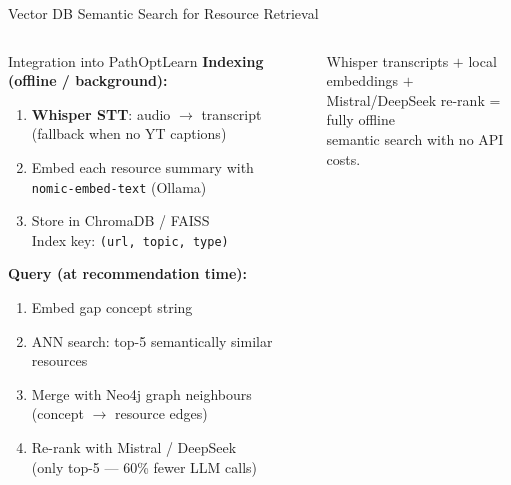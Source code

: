 \documentclass[aspectratio=169,9pt]{beamer}
\begin{document}
\begin{frame}{Vector DB Semantic Search for Resource Retrieval}
\begin{columns}[T]
  \begin{block}{Integration into PathOptLearn}
    \small
    \textbf{Indexing (offline / background):}
    \begin{enumerate}
      \item \textbf{Whisper STT}: audio $\to$ transcript\\
        (fallback when no YT captions)
      \item Embed each resource summary with\\
        \texttt{nomic-embed-text} (Ollama)
      \item Store in ChromaDB / FAISS\\
        Index key: \texttt{(url, topic, type)}
    \end{enumerate}

    \medskip
    \textbf{Query (at recommendation time):}
    \begin{enumerate}
      \item Embed gap concept string
      \item ANN search: top-5 semantically similar resources
      \item Merge with Neo4j graph neighbours\\
        (concept $\to$ resource edges)
      \item Re-rank with Mistral / DeepSeek\\
        (only top-5 — 60\% fewer LLM calls)
    \end{enumerate}
  \end{block}

  \begin{resultbox}
    \small
    Whisper transcripts $+$ local embeddings $+$\\
    Mistral/DeepSeek re-rank = fully offline\\
    semantic search with no API costs.
  \end{resultbox}
\end{columns}
\end{frame}
\end{document}
